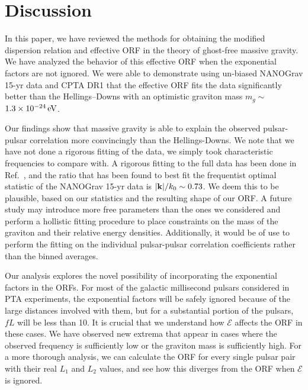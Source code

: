 \documentclass[prd,aps,psfig,nofootinbib,nobibnotes,superscriptaddress,preprintnumbers,times]{revtex4-2}\setlength{\topmargin}{-14mm}
\newcommand{\eV}{\,{\rm eV}}
\begin{document}
\section{Discussion}\label{sec:discussion}
In this paper, we have reviewed the methods for obtaining the modified dispersion relation and effective ORF in the theory of ghost-free massive gravity. We have analyzed the behavior of this effective ORF when the exponential factors are not ignored. We were able to demonstrate using un‑biased NANOGrav 15-yr data and CPTA DR1 that the effective ORF fits the data significantly better than the Hellings–Downs with an optimistic graviton mass $m_g \sim$ $1.3\times10^{-24} \eV$.

Our findings show that massive gravity is able to explain the observed pulsar-pulsar correlation more convincingly than the Hellings-Downs. We note that we have not done a rigorous fitting of the data, we simply took characteristic frequencies to compare with. A rigorous fitting to the full data has been done in Ref.\ \cite{Arjona:2024cex}, and the ratio that has been found to best fit the frequentist optimal statistic of the NANOGrav 15-yr data is $|{\bf k}|/k_0 \sim 0.73$. We deem this to be plausible, based on our statistics and the resulting shape of our ORF. A future study may introduce more free parameters than the ones we considered and perform a hollistic fitting procedure to place constraints on the mass of the graviton and their relative energy densities. Additionally, it would be of use to perform the fitting on the individual pulsar-pulsar correlation coefficients rather than the binned averages. 

Our analysis explores the novel possibility of incorporating the exponential factors in the ORFs. For most of the galactic millisecond pulsars considered in PTA experiments, the exponential factors will be safely ignored because of the large distances involved with them, but for a substantial portion of the pulsars, $fL$ will be less than 10. It is crucial that we understand how $\mathcal{E}$ affects the ORF in these cases. We have observed new extrema that appear in cases where the observed frequency is sufficiently low or the graviton mass is sufficiently high.  For a more thorough analysis, we can calculate the ORF for every single pulsar pair with their real $L_1$ and $L_2$ values, and see how this diverges from the ORF when $\mathcal{E}$ is ignored.
\end{document}
